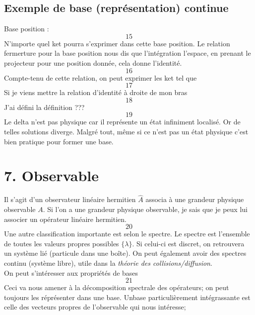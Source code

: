 \subsection{Exemple de base (représentation) continue}
Base position : 
\begin{equation}
15
\end{equation}
N'importe quel ket pourra s'exprimer dans cette base position. Le relation 
fermerture pour la base position nous dis que l'intégration l'espace, en 
prenant le projecteur pour une position donnée, cela donne l'identité.
\begin{equation}
16
\end{equation}
Compte-tenu de cette relation, on peut exprimer les ket tel que
\begin{equation}
17
\end{equation}
Si je viens mettre la relation d'identité à droite de mon bras
\begin{equation}
18
\end{equation}
J'ai défini la définition ???
\begin{equation}
19
\end{equation}
Le delta n'est pas physique car il représente un état infiniment localisé. Or 
de telles solutions diverge. Malgré tout, même si ce n'est pas un état 
physique c'est bien pratique pour former une base.





\section{7. Observable}
Il s'agit d'un observateur linéaire hermitien $\hat{A}$ associa à une grandeur 
physique observable $A$. Si l'on a une grandeur physique observable, je 
sais que je peux lui associer un opérateur linéaire hermitien. 
\begin{equation}
20
\end{equation}
Une autre classification importante est selon le spectre. Le spectre est
l'ensemble de toutes les valeurs propres possibles $\{\lambda\}$. Si celui-ci 
est discret, on retrouvera un système lié (particule dans une boîte). On 
peut également avoir des spectres continu (système libre), utile dans la 
\textit{théorie des collisions/diffusion}.\\

On peut s'intéresser aux propriétés de bases
\begin{equation}
21
\end{equation}
Ceci va nous amener à la décomposition spectrale des opérateurs; on peut 
toujours les réprésenter dans une base. Unbase particulièrement intégrassante 
est celle des vecteurs propres de l'observable qui nous intéresse; 

